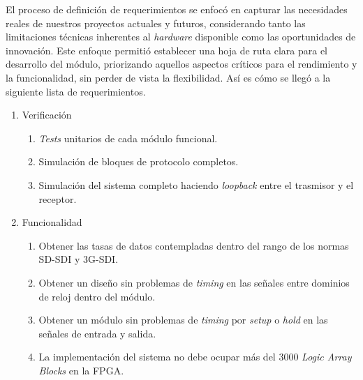   El proceso de definición de requerimientos se enfocó en capturar las
  necesidades reales de nuestros proyectos actuales y futuros, considerando tanto
  las limitaciones técnicas inherentes al \textit{hardware} disponible como las
  oportunidades de innovación. Este enfoque permitió establecer una hoja de ruta
  clara para el desarrollo del módulo, priorizando aquellos aspectos críticos
  para el rendimiento y la funcionalidad, sin perder de vista la flexibilidad.
  Así es cómo se llegó a la siguiente lista de requerimientos.

  \begin{enumerate}
      \item Verificación
      \begin{enumerate}
          \item \textit{Tests} unitarios de cada módulo funcional.
          \item Simulación de bloques de protocolo completos.
          \item Simulación del sistema completo haciendo \textit{loopback} entre el trasmisor y el receptor.
      \end{enumerate}
      \item Funcionalidad
      \begin{enumerate}
          \item Obtener las tasas de datos contempladas dentro del rango de los normas SD-SDI y 3G-SDI\@.
          \item Obtener un diseño sin problemas de \textit{timing} en las señales entre dominios de reloj
          dentro del módulo.
          \item Obtener un módulo sin problemas de \textit{timing} por \textit{setup} o \textit{hold} en las señales de entrada y salida.
          \item La implementación del sistema no debe ocupar más del 3000 \textit{Logic Array Blocks} en la FPGA\@.
      \end{enumerate}

\end{enumerate}
